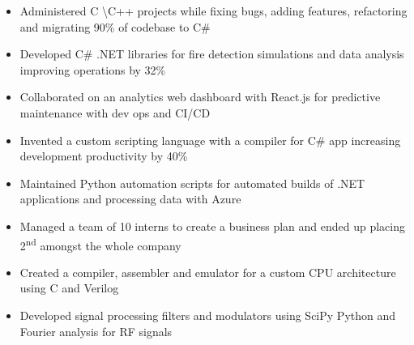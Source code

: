 \documentclass[11pt,a4paper,ragged2e]{altacv}
\begin{document}
\begin{paracol}{1}
\begin{itemize}
\item Administered C \textbackslash C++ projects while fixing bugs, adding features, refactoring and migrating 90\% of codebase to C\#
\item Developed C\# .NET libraries for fire detection simulations and data analysis improving operations by 32\%
\item Collaborated on an analytics web dashboard with React.js for predictive maintenance with dev ops and CI/CD
\item Invented a custom scripting language with a compiler for C\# app increasing development productivity by 40\%
\item Maintained Python automation scripts for automated builds of .NET applications and processing data with Azure
\item Managed a team of 10 interns to create a business plan and ended up placing  2\textsuperscript{nd} amongst the whole company
\end{itemize}
\tightdivider

\begin{itemize}
\item Created a compiler, assembler and emulator for a custom CPU architecture using C and Verilog
\item Developed signal processing filters and modulators using SciPy Python and Fourier analysis for RF signals 


\end{itemize}
\end{paracol}
\end{document}
